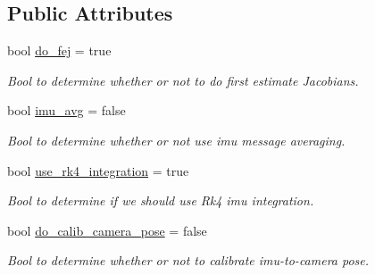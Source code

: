 \subsection*{Public Attributes}
\begin{DoxyCompactItemize}
\item 
\mbox{\label{structov__msckf_1_1StateOptions_a1a4f949ad477d10523fa06322dcc0e39}} 
bool \hyperlink{structov__msckf_1_1StateOptions_a1a4f949ad477d10523fa06322dcc0e39}{do\+\_\+fej} = true
\begin{DoxyCompactList}\small\item\em Bool to determine whether or not to do first estimate Jacobians. \end{DoxyCompactList}\item 
\mbox{\label{structov__msckf_1_1StateOptions_af4881f6bc94e9dc7d91adf2d064b131a}} 
bool \hyperlink{structov__msckf_1_1StateOptions_af4881f6bc94e9dc7d91adf2d064b131a}{imu\+\_\+avg} = false
\begin{DoxyCompactList}\small\item\em Bool to determine whether or not use imu message averaging. \end{DoxyCompactList}\item 
\mbox{\label{structov__msckf_1_1StateOptions_ab7f0a5a223c108e959c851fd80820bb0}} 
bool \hyperlink{structov__msckf_1_1StateOptions_ab7f0a5a223c108e959c851fd80820bb0}{use\+\_\+rk4\+\_\+integration} = true
\begin{DoxyCompactList}\small\item\em Bool to determine if we should use Rk4 imu integration. \end{DoxyCompactList}\item 
\mbox{\label{structov__msckf_1_1StateOptions_a9119bc2f15ba934708bf201bdb5ac225}} 
bool \hyperlink{structov__msckf_1_1StateOptions_a9119bc2f15ba934708bf201bdb5ac225}{do\+\_\+calib\+\_\+camera\+\_\+pose} = false
\begin{DoxyCompactList}\small\item\em Bool to determine whether or not to calibrate imu-\/to-\/camera pose. \end{DoxyCompactList}\item 
\mbox{\label{structov__msckf_1_1StateOptions_aff5471acfde8d4ddd4cd44e940be5177}} 

\end{DoxyCompactItemize}
